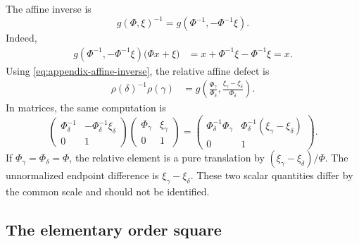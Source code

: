 The affine inverse is
\begin{equation}
  g(\Phi,\xi)^{-1}
  =g(\Phi^{-1},-\Phi^{-1}\xi).
  \label{eq:appendix-affine-inverse}
\end{equation}
Indeed,
\begin{align*}
  g(\Phi^{-1},-\Phi^{-1}\xi)
  \bigl(\Phi x+\xi\bigr)
  &=x+\Phi^{-1}\xi-\Phi^{-1}\xi=x.
\end{align*}
Using \eqref{eq:appendix-affine-inverse}, the relative affine defect is
\begin{align}
  \rho(\delta)^{-1}\rho(\gamma)
  &=g\left(
      \frac{\Phi_\gamma}{\Phi_\delta},
      \frac{\xi_\gamma-\xi_\delta}{\Phi_\delta}
    \right).
  \label{eq:appendix-relative-affine-matrix}
\end{align}
In matrices, the same computation is
\[
  \begin{pmatrix}
    \Phi_\delta^{-1}&-\Phi_\delta^{-1}\xi_\delta\\0&1
  \end{pmatrix}
  \begin{pmatrix}
    \Phi_\gamma&\xi_\gamma\\0&1
  \end{pmatrix}
  =
  \begin{pmatrix}
    \Phi_\delta^{-1}\Phi_\gamma&
    \Phi_\delta^{-1}(\xi_\gamma-\xi_\delta)\\0&1
  \end{pmatrix}.
\]
If $\Phi_\gamma=\Phi_\delta=\Phi$, the relative element is a pure translation
by $(\xi_\gamma-\xi_\delta)/\Phi$.  The unnormalized endpoint difference is
$\xi_\gamma-\xi_\delta$.  These two scalar quantities differ by the common
scale and should not be identified.

\subsection{The elementary order square}

